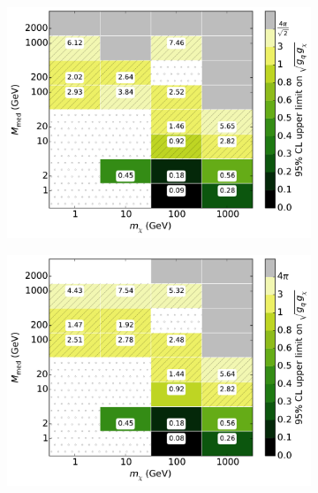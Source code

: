 \begin{figure}[h]
  \centering
    \begin{subfigure}[t]{0.495\textwidth}
      \centering
      \includegraphics[width=1.\textwidth]{figures/grid_basepoints_SAD_rat05_monoWZ.pdf}
      \caption{}
    \end{subfigure}
    \begin{subfigure}[t]{0.495\textwidth}
      \centering
      \includegraphics[width=1.\textwidth]{figures/grid_basepoints_SAD_rat1_monoWZ.pdf}
      \caption{}
    \end{subfigure}
    \begin{subfigure}[t]{0.495\textwidth}
      \centering

\end{subfigure}
\end{figure}
